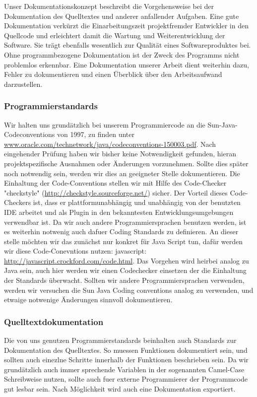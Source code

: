 \documentclass[11pt,a4paper]{article}
\begin{document}
Unser Dokumentationskonzept beschreibt die Vorgehensweise bei der Dokumentation des Quelltextes und anderer anfallender Aufgaben. Eine gute Dokumentation verkürzt die Einarbeitungszeit projektfremder Entwickler in den Quellcode und erleichtert damit die Wartung und Weiterentwicklung der Software. Sie trägt ebenfalls wesentlich zur Qualität eines Softwareproduktes bei. Ohne programmbezogene Dokumentation ist der Zweck des Programms nicht problemlos erkennbar. Eine Dokumentation unserer Arbeit dient weiterhin dazu, Fehler zu dokumentieren und einen Überblick über den Arbeitsaufwand darzustellen.

\subsubsection{Programmierstandards}

Wir halten uns grundätzlich bei unserem Programmiercode an die Sun-Java-Codeconventions von 1997, zu finden unter \url{ www.oracle.com/technetwork/java/codeconventions-150003.pdf}. Nach eingehender Prüfung haben wir bisher keine Notwendigkeit gefunden, hieran projektspezifische Ausnahmen oder Änderungen vorzunehmen. Sollte dies später noch notwendig sein, werden wir dies an geeigneter Stelle dokumentieren. Die Einhaltung der Code-Conventions stellen wir mit Hilfe des Code-Checker "checkstyle" (\url{http://checkstyle.sourceforge.net/}) sicher. Der Vorteil dieses Code-Checkers ist, dass er plattformunabhängig und unabhängig von der benutzten IDE arbeitet und als Plugin in den bekanntesten Entwicklungsumgebungen verwendbar ist.
Da wir auch andere Programmiersprachen benutzen werden, ist es weiterhin notwenig auch dafuer Coding Standards zu definieren. An dieser stelle möchten wir das zunächst nur konkret für Java Script tun, dafür werden wir diese Code-Conevntions nutzen: javascript: \url{http://javascript.crockford.com/code.html}. Das Vorgehen wird heirbei analog zu Java sein, auch hier werden wir einen Codechecker einsetzen der die Einhaltung der Standards überwacht. Sollten wir andere Programmiersprachen verwenden, werden wir versuchen die Sun Java Coding conventions analog zu verwenden, und etwaige notwenige Änderungen sinnvoll dokumentieren.

\subsubsection{Quelltextdokumentation}

Die von uns genutzen Programmierstandards beinhalten auch Standards zur Dokumentation des Quelltextes. So muessen Funktionen dokumentiert sein, und sollten auch einezlne Schritte innerhalb der Funktionen beschrieben sein. Da wir grundätzlich auch immer sprechende Variablen in der sogenannten Camel-Case Schreibweise nutzen, sollte auch fuer externe Programmierer der Programmcode gut lesbar sein. Nach Möglichkeit wird auch eine Dokumentation exportiert.
\end{document}
